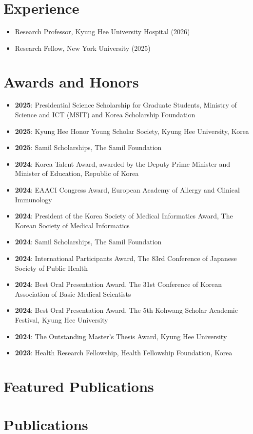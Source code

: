 \documentclass[a4paper,10pt]{article}
\newcommand{\cvItem}[2]{
  \item\small{\textbf{#1}: #2}
}
\begin{document}
\section{Experience}
\begin{itemize}
  \item Research Professor, Kyung Hee University Hospital (2026)
  \item Research Fellow, New York University (2025)
\end{itemize}

\section{Awards and Honors}
\begin{itemize}
  \cvItem{2025}{Presidential Science Scholarship for Graduate Students, Ministry of Science and ICT (MSIT) and Korea Scholarship Foundation}
  \cvItem{2025}{Kyung Hee Honor Young Scholar Society, Kyung Hee University, Korea}
  \cvItem{2025}{Samil Scholarships, The Samil Foundation}
  \cvItem{2024}{Korea Talent Award, awarded by the Deputy Prime Minister and Minister of Education, Republic of Korea}
  \cvItem{2024}{EAACI Congress Award, European Academy of Allergy and Clinical Immunology}
  \cvItem{2024}{President of the Korea Society of Medical Informatics Award, The Korean Society of Medical Informatics}
  \cvItem{2024}{Samil Scholarships, The Samil Foundation}
  \cvItem{2024}{International Participants Award, The 83rd Conference of Japanese Society of Public Health}
  \cvItem{2024}{Best Oral Presentation Award, The 31st Conference of Korean Association of Basic Medical Scientists}
  \cvItem{2024}{Best Oral Presentation Award, The 5th Kohwang Scholar Academic Festival, Kyung Hee University}
  \cvItem{2024}{The Outstanding Master's Thesis Award, Kyung Hee University}
  \cvItem{2023}{Health Research Fellowship, Health Fellowship Foundation, Korea}
\end{itemize}

\section{Featured Publications}


\section{Publications}

\end{document}

